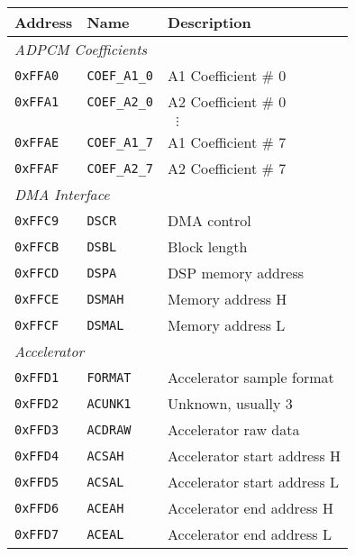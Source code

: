 \documentclass[oneside,english,a4paper,10pt,oneside,openany,final]{memoir}
\newcommand{\Address}[1]{\texttt{#1}}
\newcommand{\Register}[1]{\texttt{#1}}
\begin{document}
\begin{table}[htb]
\centering
\begin{tabular}{|l|l|l|}
\hline
\textbf{Address} & \textbf{Name}      & \textbf{Description}          \\ \hline
\multicolumn{3}{|l|}{\textit{ADPCM Coefficients}}                     \\ \hline
\Address{0xFFA0} & \Register{COEF\_A1\_0} & A1 Coefficient \# 0 \\ \hline
\Address{0xFFA1} & \Register{COEF\_A2\_0} & A2 Coefficient \# 0 \\ \hline
\multicolumn{3}{|c|}{$\vdots$}                                  \\ \hline
\Address{0xFFAE} & \Register{COEF\_A1\_7} & A1 Coefficient \# 7 \\ \hline
\Address{0xFFAF} & \Register{COEF\_A2\_7} & A2 Coefficient \# 7 \\ \hline
\multicolumn{3}{|l|}{\textit{DMA Interface}}                          \\ \hline
\Address{0xFFC9} & \Register{DSCR}    & DMA control                   \\ \hline
\Address{0xFFCB} & \Register{DSBL}    & Block length                  \\ \hline
\Address{0xFFCD} & \Register{DSPA}    & DSP memory address            \\ \hline
\Address{0xFFCE} & \Register{DSMAH}   & Memory address H              \\ \hline
\Address{0xFFCF} & \Register{DSMAL}   & Memory address L              \\ \hline
\multicolumn{3}{|l|}{\textit{Accelerator}}                            \\ \hline
\Address{0xFFD1} & \Register{FORMAT}  & Accelerator sample format     \\ \hline
\Address{0xFFD2} & \Register{ACUNK1}  & Unknown, usually 3            \\ \hline
\Address{0xFFD3} & \Register{ACDRAW}  & Accelerator raw data          \\ \hline
\Address{0xFFD4} & \Register{ACSAH}   & Accelerator start address H   \\ \hline
\Address{0xFFD5} & \Register{ACSAL}   & Accelerator start address L   \\ \hline
\Address{0xFFD6} & \Register{ACEAH}   & Accelerator end address H     \\ \hline
\Address{0xFFD7} & \Register{ACEAL}   & Accelerator end address L     \\ \hline

\end{tabular}
\end{table}
\end{document}
